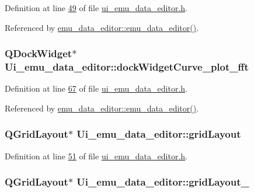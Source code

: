Definition at line \hyperlink{a00051_source_l00049}{49} of file \hyperlink{a00051_source}{ui\+\_\+emu\+\_\+data\+\_\+editor.\+h}.



Referenced by \hyperlink{a00035_source_l00012}{emu\+\_\+data\+\_\+editor\+::emu\+\_\+data\+\_\+editor()}.

\hypertarget{a00026_a7474d72172d9e269e8f3cb22bbe2fc86}{
\subsubsection[{dock\+Widget\+Curve\+\_\+plot\+\_\+fft}]{\setlength{\rightskip}{0pt plus 5cm}Q\+Dock\+Widget$\ast$ Ui\+\_\+emu\+\_\+data\+\_\+editor\+::dock\+Widget\+Curve\+\_\+plot\+\_\+fft}}\label{a00026_a7474d72172d9e269e8f3cb22bbe2fc86}


Definition at line \hyperlink{a00051_source_l00067}{67} of file \hyperlink{a00051_source}{ui\+\_\+emu\+\_\+data\+\_\+editor.\+h}.



Referenced by \hyperlink{a00035_source_l00012}{emu\+\_\+data\+\_\+editor\+::emu\+\_\+data\+\_\+editor()}.

\hypertarget{a00026_ad06b82b83a9a74377d6ca44ae699f945}{
\subsubsection[{grid\+Layout}]{\setlength{\rightskip}{0pt plus 5cm}Q\+Grid\+Layout$\ast$ Ui\+\_\+emu\+\_\+data\+\_\+editor\+::grid\+Layout}}\label{a00026_ad06b82b83a9a74377d6ca44ae699f945}


Definition at line \hyperlink{a00051_source_l00051}{51} of file \hyperlink{a00051_source}{ui\+\_\+emu\+\_\+data\+\_\+editor.\+h}.

\hypertarget{a00026_ab6610272c6c39cba66cab113d98dcdcd}{
\subsubsection[{grid\+Layout\+\_\+2}]{\setlength{\rightskip}{0pt plus 5cm}Q\+Grid\+Layout$\ast$ Ui\+\_\+emu\+\_\+data\+\_\+editor\+::grid\+Layout\+\_}}\label{a00026_ab6610272c6c39cba66cab113d98dcdcd}


